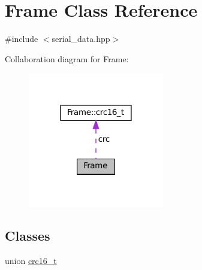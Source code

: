 \hypertarget{classFrame}{}\section{Frame Class Reference}
\label{classFrame}


{\ttfamily \#include $<$serial\+\_\+data.\+hpp$>$}



Collaboration diagram for Frame\+:
\nopagebreak
\begin{figure}[H]
\begin{center}
\leavevmode
\includegraphics[width=168pt]{classFrame__coll__graph}
\end{center}
\end{figure}
\subsection*{Classes}
\begin{DoxyCompactItemize}
\item 
union \hyperlink{unionFrame_1_1crc16__t}{crc16\+\_\+t}
\end{DoxyCompactItemize}
